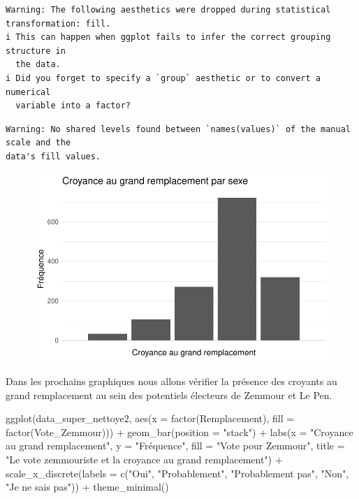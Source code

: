 \documentclass[
  letterpaper,
  DIV=11,
  numbers=noendperiod]{scrartcl}
\newenvironment{Shaded}{\begin{snugshade}}{\end{snugshade}}
\newcommand{\AttributeTok}[1]{\textcolor[rgb]{0.40,0.45,0.13}{#1}}
\newcommand{\FunctionTok}[1]{\textcolor[rgb]{0.28,0.35,0.67}{#1}}
\newcommand{\NormalTok}[1]{\textcolor[rgb]{0.00,0.23,0.31}{#1}}
\newcommand{\SpecialCharTok}[1]{\textcolor[rgb]{0.37,0.37,0.37}{#1}}
\newcommand{\StringTok}[1]{\textcolor[rgb]{0.13,0.47,0.30}{#1}}
\begin{document}
\begin{verbatim}
Warning: The following aesthetics were dropped during statistical transformation: fill.
i This can happen when ggplot fails to infer the correct grouping structure in
  the data.
i Did you forget to specify a `group` aesthetic or to convert a numerical
  variable into a factor?
\end{verbatim}

\begin{verbatim}
Warning: No shared levels found between `names(values)` of the manual scale and the
data's fill values.
\end{verbatim}

\begin{figure}[H]

{\centering \includegraphics{travail_session_Akyildiz_files/figure-pdf/unnamed-chunk-3-1.pdf}

}

\end{figure}

Dans les prochains graphiques nous allons vérifier la présence des
croyants au grand remplacement au sein des potentiels électeurs de
Zemmour et Le Pen.

\begin{Shaded}
\begin{Highlighting}[]
\FunctionTok{ggplot}\NormalTok{(data\_super\_nettoye2, }\FunctionTok{aes}\NormalTok{(}\AttributeTok{x =} \FunctionTok{factor}\NormalTok{(Remplacement), }\AttributeTok{fill =} \FunctionTok{factor}\NormalTok{(Vote\_Zemmour))) }\SpecialCharTok{+}
  \FunctionTok{geom\_bar}\NormalTok{(}\AttributeTok{position =} \StringTok{"stack"}\NormalTok{) }\SpecialCharTok{+}
  \FunctionTok{labs}\NormalTok{(}\AttributeTok{x =} \StringTok{"Croyance au grand remplacement"}\NormalTok{, }\AttributeTok{y =} \StringTok{"Fréquence"}\NormalTok{, }\AttributeTok{fill =} \StringTok{"Vote pour Zemmour"}\NormalTok{, }\AttributeTok{title =} \StringTok{"Le vote zemmouriste et la croyance au grand remplacement"}\NormalTok{) }\SpecialCharTok{+}
  \FunctionTok{scale\_x\_discrete}\NormalTok{(}\AttributeTok{labels =} \FunctionTok{c}\NormalTok{(}\StringTok{"Oui"}\NormalTok{, }\StringTok{"Probablement"}\NormalTok{, }\StringTok{"Probablement pas"}\NormalTok{, }\StringTok{"Non"}\NormalTok{, }\StringTok{"Je ne sais pas"}\NormalTok{)) }\SpecialCharTok{+}
  \FunctionTok{theme\_minimal}\NormalTok{()}
\end{Highlighting}
\end{Shaded}
\end{document}
